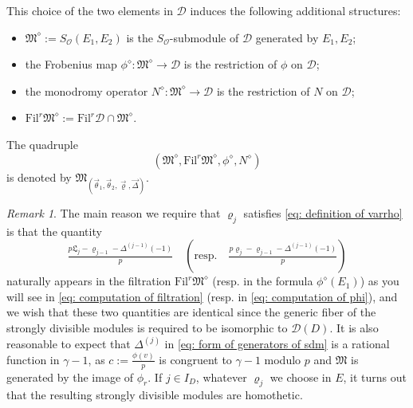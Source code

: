 \documentclass[11pt]{amsart}
\theoremstyle{definition}
\numberwithin{equation}{subsection}
\theoremstyle{plain}
\theoremstyle{plain}
\theoremstyle{plain}
\theoremstyle{plain}
\theoremstyle{plain}
\theoremstyle{plain}
\theoremstyle{plain}
\theoremstyle{plain}
\theoremstyle{plain}
\theoremstyle{plain}
\theoremstyle{plain}
\theoremstyle{plain}
\theoremstyle{definition}
\theoremstyle{definition}
\theoremstyle{definition}
\theoremstyle{remark}
\newtheorem{rema}[equation]{Remark}
\renewcommand{\(}{\textup{(}}
\renewcommand{\)}{\textup{)}}
\newcommand{\fM}{\mathfrak{M}}
\newcommand{\fL}{\mathfrak{L}}
\newcommand{\Fil}{\mathrm{Fil}}
\newcommand{\cD}{\mathcal{D}}
\newcommand{\cO}{\mathcal{O}}
\newcommand{\vth}{\vec{\theta}}
\newcommand{\vrho}{\vec{\varrho}}
\newcommand{\vDel}{\vec{\Delta}}
\begin{document}
This choice of the two elements in $\cD$ induces the following additional structures:
\begin{itemize}[leftmargin=*]
\item $\fM^{\diamond}:=S_\cO(E_1,E_2)$ is the $S_\cO$-submodule of $\cD$ generated by $E_1,E_2$;
\item the Frobenius map $\phi^{\diamond}:\fM^{\diamond}\rightarrow \cD$ is the restriction of $\phi$ on $\cD$;
\item the monodromy operator $N^\diamond:\fM^{\diamond}\rightarrow \cD$ is the restriction of $N$ on $\cD$;
\item $\Fil^r\fM^\diamond:=\Fil^r\cD\cap \fM^\diamond$.
\end{itemize}
The quadruple 
\begin{equation}\label{eq: definition of fM_vth,vth,vDel}
(\fM^\diamond,\Fil^r\fM^\diamond,\phi^\diamond,N^\diamond)
\end{equation}
is denoted by $\fM_{(\vth_1,\vth_2,\vrho,\vDel)}$. 

\begin{rema}
The main reason we require that $\varrho_j$ satisfies \eqref{eq: definition of varrho} is that the quantity $$\tfrac{p\fL_j-\varrho_{j-1}-\Delta^{(j-1)}(-1)}{p} \quad (\mbox{resp}.\quad \tfrac{p\varrho_j-\varrho_{j-1}-\Delta^{(j-1)}(-1)}{p})$$ naturally appears in the filtration $\Fil^r\fM^\diamond$ (resp. in the formula $\phi^\diamond(E_1)$) as you will see in \eqref{eq: computation of filtration} (resp. in \eqref{eq: computation of phi}), and we wish that these two quantities are identical since the generic fiber of the strongly divisible modules is required to be isomorphic to $\cD(D)$. It is also reasonable to expect that $\Delta^{(j)}$ in \eqref{eq: form of generators of sdm} is a rational function in $\gamma-1$, as $c:=\frac{\phi(v)}{p}$ is congruent to $\gamma-1$ modulo $p$ and $\fM$ is generated by the image of $\phi_r$. If $j\in I_D$, whatever $\varrho_j$ we choose in $E$, it turns out that the resulting strongly divisible modules are homothetic.
\end{rema}
\end{document}
